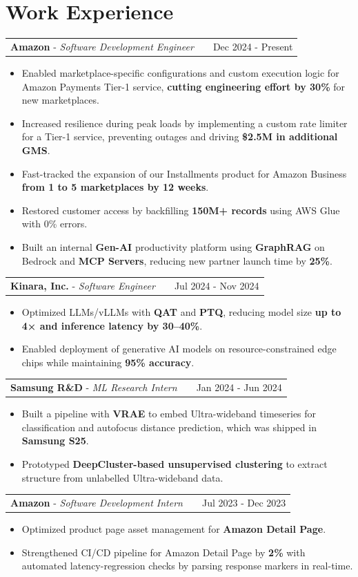 \documentclass[a4paper,9pt]{article}
\makeatletter
\newenvironment{joblong}[3]
    {
    \begin{tabularx}{\linewidth}{@{}l X r@{}}
    \textbf{#1} - \textit{#2} & & #3 \\[3.75pt]
    \end{tabularx}
    \begin{minipage}[t]{\linewidth}
    \begin{itemize}[nosep, leftmargin=1em, itemsep=1pt, label=\textbullet]
    }
    {
    \end{itemize}
    \end{minipage}
    }
\makeatother
\begin{document}
\section{Work Experience}

\begin{joblong}{Amazon}{Software Development Engineer}{Dec 2024 - Present}
\item Enabled marketplace-specific configurations and custom execution logic for Amazon Payments Tier-1 service, \textbf{cutting engineering effort by 30\%} for new marketplaces.
\item Increased resilience during peak loads by implementing a custom rate limiter for a Tier-1 service, preventing outages and driving \textbf{\$2.5M in additional GMS}.
\item Fast-tracked the expansion of our Installments product for Amazon Business \textbf{from 1 to 5 marketplaces by 12 weeks}.
\item Restored customer access by backfilling \textbf{150M+ records} using AWS Glue with 0\% errors.
\item Built an internal \textbf{Gen-AI} productivity platform using \textbf{GraphRAG} on Bedrock and \textbf{MCP Servers}, reducing new partner launch time by \textbf{25\%}.
\end{joblong}

\begin{joblong}{Kinara, Inc.}{Software Engineer}{Jul 2024 - Nov 2024}
\item Optimized LLMs/vLLMs with \textbf{QAT} and \textbf{PTQ}, reducing model size \textbf{up to 4× and inference latency by 30–40\%}. 
\item Enabled deployment of generative AI models on resource-constrained edge chips while maintaining \textbf{95\% accuracy}.
\end{joblong}

\begin{joblong}{Samsung R\&D}{ML Research Intern}{Jan 2024 - Jun 2024}
\item Built a pipeline with \textbf{VRAE} to embed Ultra-wideband timeseries for classification and autofocus distance prediction, which was shipped in \textbf{Samsung S25}.
\item Prototyped \textbf{DeepCluster-based unsupervised clustering} to extract structure from unlabelled Ultra-wideband data.
\end{joblong}

\begin{joblong}{Amazon}{Software Development Intern}{Jul 2023 - Dec 2023}
\item Optimized product page asset management for \textbf{Amazon Detail Page}.
\item Strengthened CI/CD pipeline for Amazon Detail Page by \textbf{2\%} with automated latency-regression checks by parsing response markers in real-time.
\end{joblong}
\end{document}
